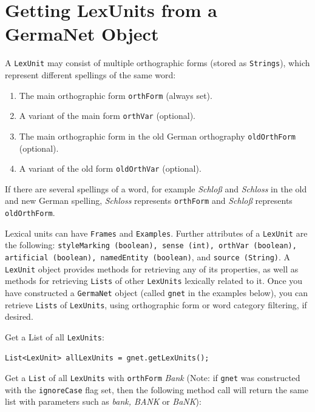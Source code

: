 \documentclass[12pt,a4paper,english,utf8]{report}
\begin{document}
\section{Getting LexUnits from a GermaNet Object}
A \texttt{LexUnit} may consist of multiple orthographic forms (stored as \texttt{Strings}), which represent different spellings of the same word:

\begin{enumerate}
	\item The main orthographic form \texttt{orthForm} (always set).
	\item A variant of the main form \texttt{orthVar} (optional).
	\item The main orthographic form in the old German orthography \texttt{oldOrthForm} (optional).
	\item A variant of the old form \texttt{oldOrthVar} (optional).
\end{enumerate}

If there are several spellings of a word, for example \emph{Schloß} and \emph{Schloss} in the old and new German spelling, \emph{Schloss} represents \texttt{orthForm} and \emph{Schloß} represents \texttt{oldOrthForm}.

\begin{sloppypar}
Lexical units can have \texttt{Frames} and \texttt{Examples}. Further attributes of a \texttt{LexUnit} are the following: \texttt{styleMarking (boolean), sense (int), orthVar (boolean), artificial (boolean), namedEntity (boolean)}, and \texttt{source (String)}. A \texttt{LexUnit} object provides methods for retrieving any of its properties, as well as methods for retrieving \texttt{Lists} of other \texttt{LexUnits} lexically related to it. Once you have constructed a \texttt{GermaNet} object (called \texttt{gnet} in the examples below), you can retrieve \texttt{Lists} of \texttt{LexUnits}, using orthographic form or word category filtering, if desired.
\end{sloppypar}

Get a List of all \texttt{LexUnits}:

\begin{lstlisting}
List<LexUnit> allLexUnits = gnet.getLexUnits();
\end{lstlisting}

Get a \texttt{List} of all \texttt{LexUnits} with \texttt{orthForm} \emph{Bank} (Note: if \texttt{gnet} was constructed with the \texttt{ignoreCase} flag set, then the following method call will return the same list with parameters such as \emph{bank, BANK} or \emph{BaNK}):
\end{document}
